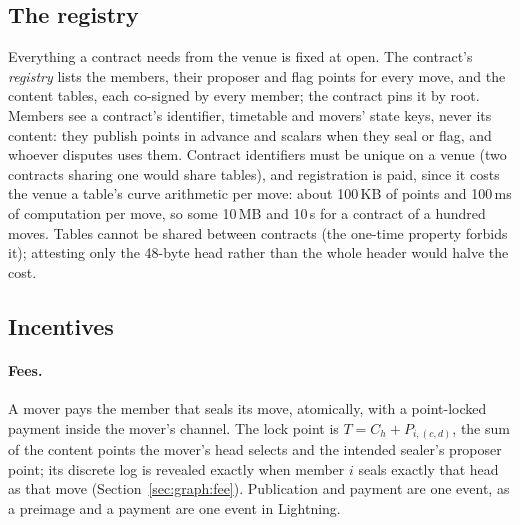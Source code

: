 \documentclass[11pt]{article}
\begin{document}
\subsection{The registry}

Everything a contract needs from the venue is fixed at open. The
contract's \emph{registry} lists the members, their proposer and flag
points for every move, and the content tables, each co-signed by every
member; the contract pins it by root. Members see a contract's
identifier, timetable and movers' state keys, never its content: they
publish points in advance and scalars when they seal or flag, and
whoever disputes uses them. Contract identifiers must be unique on a
venue (two contracts sharing one would share tables), and registration
is paid, since it costs the venue a table's curve arithmetic per move:
about 100\,KB of points and 100\,ms of computation per move, so some
10\,MB and 10\,s for a contract of a hundred moves. Tables cannot be
shared between contracts (the one-time property forbids it); attesting
only the 48-byte head rather than the whole header would halve the
cost.

\subsection{Incentives}

\paragraph{Fees.} A mover pays the member that seals its move,
atomically, with a point-locked payment inside the mover's channel. The
lock point is $T = C_h + P_{i,(c,d)}$, the sum of the content points the
mover's head selects and the intended sealer's proposer point; its
discrete log is revealed exactly when member $i$ seals exactly that
head as that move (Section~\ref{sec:graph:fee}). Publication and payment
are one event, as a preimage and a payment are one event in Lightning.
\end{document}
